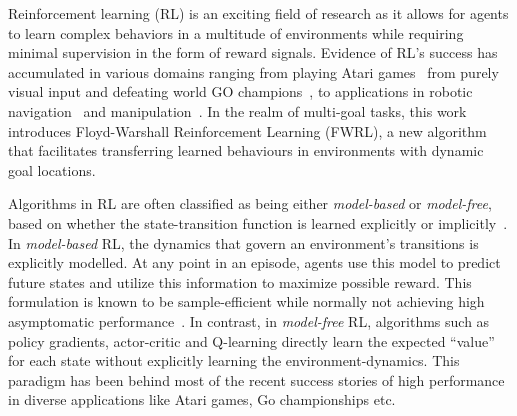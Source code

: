 Reinforcement learning (RL) is an exciting field of research as it allows for
agents to learn complex behaviors in a multitude of environments while requiring
minimal supervision in the form of reward signals. Evidence of RL's success has
accumulated in various domains ranging from playing Atari
games~\citep{MnKaSiNATURE2015} from purely visual input and defeating world GO
champions~\citep{gibney2016google}, to applications in robotic
navigation~\citep{mirowski2018learning} and
manipulation~\citep{pong2018temporal}. In the realm of multi-goal tasks, this
work introduces Floyd-Warshall Reinforcement Learning (FWRL), a new algorithm
that facilitates transferring learned behaviours in environments with dynamic
goal locations.


Algorithms in RL are often classified as being either \emph{model-based} or
\emph{model-free}, based on whether the state-transition function is learned
explicitly or implicitly~\citep{SuBaBOOK1998}.
In \emph{model-based} RL, the dynamics that govern an environment's
transitions is explicitly modelled.  At any point in an episode, agents
use this model to predict future states and utilize this information to
maximize possible reward. This formulation is known to be
sample-efficient while normally not achieving high asymptomatic
performance~\citep{pong2018temporal}.  In contrast, in \emph{model-free}
RL, algorithms such as policy gradients, actor-critic and Q-learning
directly learn the expected ``value'' for each state without explicitly
learning the environment-dynamics. This paradigm has been behind most of
the recent success stories of high performance in diverse applications
like Atari games, Go championships etc.

